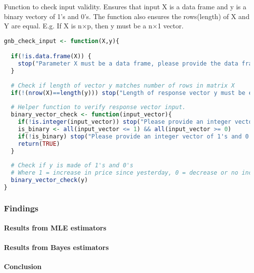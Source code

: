 \documentclass{article}
\begin{document}
\newpage

Function to check input validity. Ensures that input X is a data frame and y is a binary vectory of 1's and 0's. The function also ensures the rows(length) of X and Y are equal. E.g. If X is n$\times$p, then y must be a n$\times$1 vector.
\begin{lstlisting}[language=R]
gnb_check_input <- function(X,y){

  if(!is.data.frame(X)) {
    stop("Parameter X must be a data frame, please provide the data frame whose columns are numeric variables and rows are observations")
  }
  
  # Check if length of vector y matches number of rows in matrix X
  if(!(nrow(X)==length(y))) stop("Length of response vector y must be equal to number of rows in X")
  
  # Helper function to verify response vector input.
  binary_vector_check <- function(input_vector){
    if(!is.integer(input_vector)) stop("Please provide an integer vector")    
    is_binary <- all(input_vector <= 1) && all(input_vector >= 0)    
    if(!is_binary) stop("Please provide an integer vector of 1's and 0's")
    return(TRUE)
  }
  
  # Check if y is made of 1's and 0's
  # Where 1 = increase in price since yesterday, 0 = decrease or no increase
  binary_vector_check(y)
}

\end{lstlisting}

\subsubsection{Findings}

\paragraph{Results from MLE estimators}


\paragraph{Results from Bayes estimators}

\paragraph{Conclusion}
\end{document}
